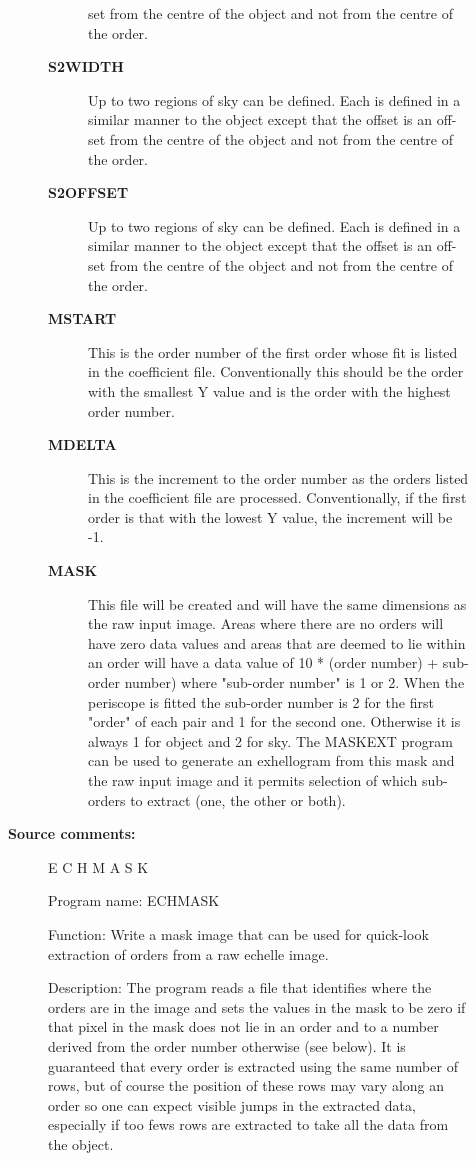 \begin{description}
\begin{description}
\begin{description}
 set from the centre of the object and not from the centre of
 the order.
\item [\textbf{S2WIDTH}]
 Up to two regions of sky can be defined. Each is defined in a
 similar manner to the object except that the offset is an off-
 set from the centre of the object and not from the centre of
 the order.
\item [\textbf{S2OFFSET}]
 Up to two regions of sky can be defined. Each is defined in a
 similar manner to the object except that the offset is an off-
 set from the centre of the object and not from the centre of
 the order.
\item [\textbf{MSTART}]
 This is the order number of the first order whose fit is
 listed in the coefficient file. Conventionally this should
 be the order with the smallest Y value and is the order with
 the highest order number.
\item [\textbf{MDELTA}]
 This is the increment to the order number as the orders listed
 in the coefficient file are processed. Conventionally, if the
 first order is that with the lowest Y value, the increment
 will be -1.
\item [\textbf{MASK}]
 This file will be created and will have the same dimensions
 as the raw input image. Areas where there are no orders will
 have zero data values and areas that are deemed to lie within
 an order will have a data value of 10 * (order number) +
 sub-order number) where "sub-order number" is 1 or 2. When
 the periscope is fitted the sub-order number is 2 for the
 first "order" of each pair and 1 for the second one. Otherwise
 it is always 1 for object and 2 for sky. The MASKEXT program
 can be used to generate an exhellogram from this mask and the
 raw input image and it permits selection of which sub-orders
 to extract (one, the other or both).
\end{description}

\item [\textbf{Source comments:}]
\begin{terminalv}
 E C H M A S K

 Program name:
    ECHMASK

 Function:
    Write a mask image that can be used for quick-look extraction of
    orders from a raw echelle image.

 Description:
    The program reads a file that identifies where the orders are in
    the image and sets the values in the mask to be zero if that pixel
    in the mask does not lie in an order and to a number derived from
    the order number otherwise (see below). It is guaranteed that
    every order is extracted using the same number of rows, but of
    course the position of these rows may vary along an order so one
    can expect visible jumps in the extracted data, especially if too
    fews rows are extracted to take all the data from the object.


\end{terminalv}
\end{description}
\end{description}
